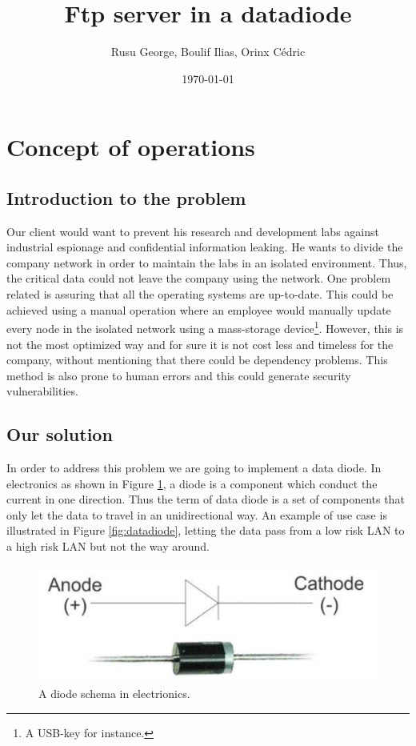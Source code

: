 \documentclass[a4paper,10pt]{article}
\title{Ftp server in a datadiode}
\author{Rusu George, Boulif Ilias, Orinx Cédric}
\date{\today}
\begin{document}
\maketitle
\newpage
\tableofcontents
\newpage
\section{Concept of operations}
\subsection{Introduction to the problem}
Our client would want to prevent his research and development labs against industrial espionage and confidential information leaking. He wants to divide the company network in order to maintain the labs in an isolated environment. Thus, the critical data could not leave the company using the network. One problem related is assuring that all the operating systems are up-to-date. This could be achieved using a manual operation where an employee would manually update every node in the isolated network using a mass-storage device\footnote{A USB-key for instance.}. However, this is not the most optimized way and for sure it is not cost less and timeless for the company, without mentioning that there could be dependency problems. This method is also prone to human errors and this could generate security vulnerabilities.

\subsection{Our solution}
In order to address this problem we are going to implement a data diode. In electronics as shown in Figure \ref{fig:diode}, a diode is a component which conduct the current in one direction. Thus the term of data diode is a set of components that only let the data to travel in an unidirectional way. An example of use case is illustrated in Figure \ref{fig:datadiode}, letting the data pass from a low risk LAN to a high risk LAN but not the way around.
\begin{figure}
\centering
\includegraphics[scale=0.25]{images/diode.png}
\caption{A diode schema in electrionics.}
\label{fig:diode}
\end{figure}
\end{document}
